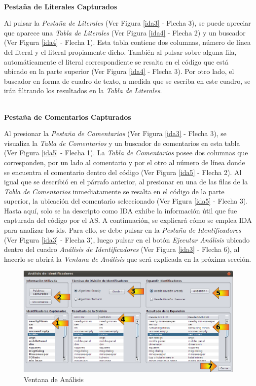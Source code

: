 \noindent \textbf{\\Pestaña de Literales Capturados\\} 

Al pulsar la \textit{Pestaña de Literales} (Ver Figura \ref{ida3} - Flecha 3), se puede apreciar que aparece una \textit{Tabla de Literales} (Ver Figura \ref{ida4} - Flecha 2) y un buscador (Ver Figura \ref{ida4} - Flecha 1). Esta tabla contiene dos columnas, número de línea del literal y el literal propiamente dicho. También al pulsar sobre alguna fila, automáticamente el literal correspondiente se resalta en el código que está ubicado en la parte superior (Ver Figura \ref{ida4} - Flecha 3). Por otro lado, el buscador en forma de cuadro de texto, a medida que se escriba en este cuadro, se irán filtrando los resultados en la \textit{Tabla de Literales}.

\noindent \textbf{\\Pestaña de Comentarios Capturados\\} 

Al presionar la \textit{Pestaña de Comentarios} (Ver Figura \ref{ida3} - Flecha 3), se visualiza la \textit{Tabla de Comentarios} y un buscador de comentarios en esta tabla (Ver Figura \ref{ida5} - Flecha 1). La \textit{Tabla de Comentarios} posee dos columnas que corresponden, por un lado al comentario y por el otro al número de línea donde se encuentra el comentario dentro del código (Ver Figura \ref{ida5} - Flecha 2). Al igual que se describió en el párrafo anterior, al presionar en una de las filas de la \textit{Tabla de Comentarios} inmediatamente se resalta en el código de la parte superior, la ubicación del comentario seleccionado (Ver Figura \ref{ida5} - Flecha 3).\\

Hasta aquí, solo se ha descripto como IDA exhibe la información útil que fue capturada del código por el AS. A continuación, se explicará cómo se emplea IDA para analizar los ids. Para ello, se debe pulsar en la \textit{Pestaña de Identificadores} (Ver Figura \ref{ida3} - Flecha 3), luego pulsar en el botón \textit{Ejecutar Análisis} ubicado dentro del cuadro \textit{Análisis de Identificadores} (Ver Figura \ref{ida3} - Flecha 6), al hacerlo se abrirá la \textit{Ventana de Análisis} que será explicada en la próxima sección.

\begin{figure}[h!] %
\centerline{%
\includegraphics[scale= 0.52]{./cap4/ida_06.png}
}
\caption{Ventana de Análisis}
\label{ida6}
\end{figure}

